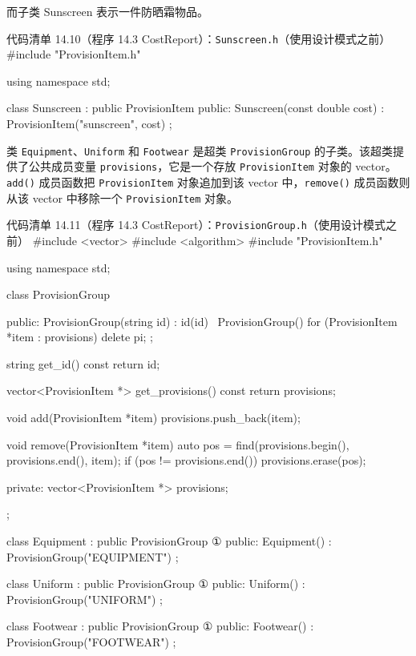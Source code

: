 而子类 Sunscreen 表示一件防晒霜物品。

\begin{codeboxt}{代码清单 14.10（程序 14.3 CostReport）：\texttt{Sunscreen.\allowbreak{}h}（使用设计模式之前）}
#include "ProvisionItem.h"

using namespace std;

class Sunscreen : public ProvisionItem
{
public:
    Sunscreen(const double cost) 
        : ProvisionItem("sunscreen", cost) {}
};
\end{codeboxt}

类 \texttt{Equipment}、\texttt{Uniform} 和 \texttt{Footwear} 是超类 \texttt{Provision\allowbreak{}Group} 的子类。该超类提供了公共成员变量 \texttt{provisions}，它是一个存放 \texttt{Provision\allowbreak{}Item} 对象的 vector。\texttt{add()} 成员函数把 \texttt{Provision\allowbreak{}Item} 对象追加到该 vector 中，\texttt{remove()} 成员函数则从该 vector 中移除一个 \texttt{Provision\allowbreak{}Item} 对象。

\begin{codeboxt}{代码清单 14.11（程序 14.3 CostReport）：\texttt{Provision\allowbreak{}Group.\allowbreak{}h}（使用设计模式之前）}
#include <vector>
#include <algorithm>
#include "ProvisionItem.h"

using namespace std;

class ProvisionGroup
{
public:
    ProvisionGroup(string id) : id(id) {}
    ~ProvisionGroup()
    {
        for (ProvisionItem *item : provisions) { delete pi; };
    }

    string get_id() const { return id; }

    vector<ProvisionItem *> get_provisions() const
    {
        return provisions;
    }

    void add(ProvisionItem *item) { provisions.push_back(item); }

    void remove(ProvisionItem *item)
    {
        auto pos = find(provisions.begin(), provisions.end(), item);
        if (pos != provisions.end()) provisions.erase(pos);
    }

private:
    vector<ProvisionItem *> provisions;
};

class Equipment : public ProvisionGroup    ①
{
public:
    Equipment() : ProvisionGroup("EQUIPMENT") {}
};

class Uniform : public ProvisionGroup      ①
{
public:
    Uniform() : ProvisionGroup("UNIFORM") {}
};

class Footwear : public ProvisionGroup     ①
{
public:
    Footwear() : ProvisionGroup("FOOTWEAR") {}
};
\end{codeboxt}
\par

